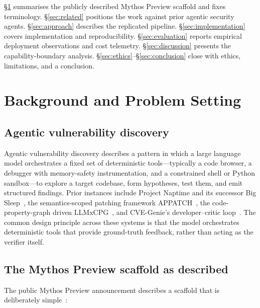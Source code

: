 \documentclass[11pt,a4paper]{article}
\begin{document}
\S\ref{sec:background} summarises the publicly described Mythos Preview
scaffold and fixes terminology. \S\ref{sec:related} positions the work
against prior agentic security agents. \S\ref{sec:approach} describes the
replicated pipeline. \S\ref{sec:implementation} covers implementation and
reproducibility. \S\ref{sec:evaluation} reports empirical deployment
observations and cost telemetry.
\S\ref{sec:discussion} presents the capability-boundary analysis.
\S\ref{sec:ethics}--\S\ref{sec:conclusion} close with ethics, limitations,
and a conclusion.

\section{Background and Problem Setting}
\label{sec:background}

\subsection{Agentic vulnerability discovery}

Agentic vulnerability discovery describes a pattern in which a large
language model orchestrates a fixed set of deterministic tools---typically
a code browser, a debugger with memory-safety instrumentation, and a
constrained shell or Python sandbox---to explore a target codebase, form
hypotheses, test them, and emit structured findings. Prior instances
include Project Naptime and its successor Big
Sleep~\citep{projectzeroNaptime2024,projectzeroBigSleep2024}, the
semantics-scoped patching framework APPATCH~\citep{appatch2025}, the
code-property-graph driven LLMxCPG~\citep{llmxcpg2025}, and CVE-Genie's
developer--critic loop~\citep{cvegenie2025}. The common design principle
across these systems is that the model orchestrates deterministic tools
that provide ground-truth feedback, rather than acting as the verifier
itself.

\subsection{The Mythos Preview scaffold as described}
\label{sec:background-mythos}

The public Mythos Preview announcement describes a scaffold that is
deliberately simple~\citep{anthropicMythos2026}:
\end{document}

